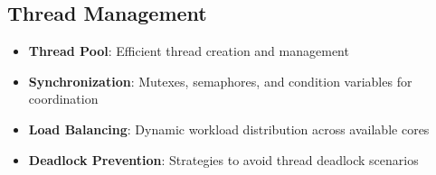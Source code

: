 \subsection{Thread Management}\label{subsec:thread-management}

\begin{itemize}
\item \textbf{Thread Pool}: Efficient thread creation and management
\item \textbf{Synchronization}: Mutexes, semaphores, and condition variables for coordination~\cite{park2022thread}
\item \textbf{Load Balancing}: Dynamic workload distribution across available cores
\item \textbf{Deadlock Prevention}: Strategies to avoid thread deadlock scenarios
\end{itemize}
